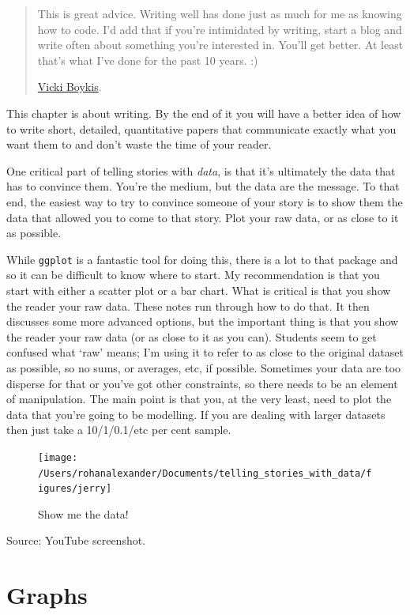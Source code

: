 \documentclass[
]{book}
\begin{document}
\begin{quote}
This is great advice. Writing well has done just as much for me as knowing how to code. I'd add that if you're intimidated by writing, start a blog and write often about something you're interested in. You'll get better. At least that's what I've done for the past 10 years. :)

\href{https://twitter.com/vboykis/status/1224351069771386881?s=21}{Vicki Boykis}.
\end{quote}

This chapter is about writing. By the end of it you will have a better idea of how to write short, detailed, quantitative papers that communicate exactly what you want them to and don't waste the time of your reader.

One critical part of telling stories with \emph{data}, is that it's ultimately the data that has to convince them. You're the medium, but the data are the message. To that end, the easiest way to try to convince someone of your story is to show them the data that allowed you to come to that story. Plot your raw data, or as close to it as possible.

While \texttt{ggplot} is a fantastic tool for doing this, there is a lot to that package and so it can be difficult to know where to start. My recommendation is that you start with either a scatter plot or a bar chart. What is critical is that you show the reader your raw data. These notes run through how to do that. It then discusses some more advanced options, but the important thing is that you show the reader your raw data (or as close to it as you can). Students seem to get confused what `raw' means; I'm using it to refer to as close to the original dataset as possible, so no sums, or averages, etc, if possible. Sometimes your data are too disperse for that or you've got other constraints, so there needs to be an element of manipulation. The main point is that you, at the very least, need to plot the data that you're going to be modelling. If you are dealing with larger datasets then just take a 10/1/0.1/etc per cent sample.

\begin{figure}
\texttt{[image: /Users/rohanalexander/Documents/telling\_stories\_with\_data/figures/jerry]} \caption{Show me the data!}\label{fig:unnamed-chunk-85}
\end{figure}

Source: YouTube screenshot.

\hypertarget{graphs}{%
\section{Graphs}\label{graphs}}
\end{document}
